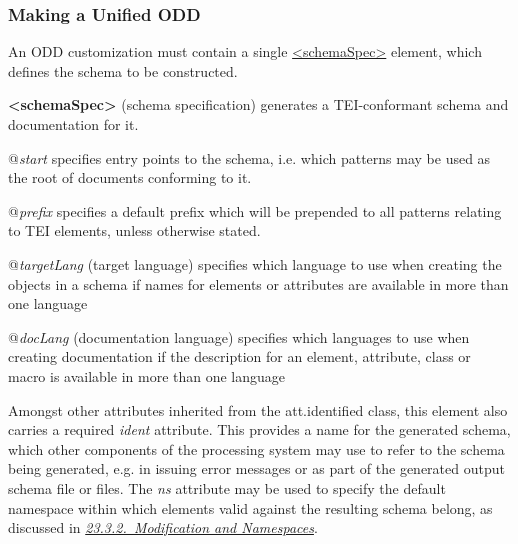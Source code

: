 \subsubsection[{Making a Unified ODD}]{Making a Unified ODD}\label{IM-unified}\par
An ODD customization must contain a single \hyperref[TEI.schemaSpec]{<schemaSpec>} element, which defines the schema to be constructed. 
\begin{sansreflist}
  
\item [\textbf{<schemaSpec>}] (schema specification) generates a TEI-conformant schema and documentation for it.\hfil\\[-10pt]\begin{sansreflist}
    \item[@{\itshape start}]
  specifies entry points to the schema, i.e. which patterns may be used as the root of documents conforming to it.
    \item[@{\itshape prefix}]
  specifies a default prefix which will be prepended to all patterns relating to TEI elements, unless otherwise stated.
    \item[@{\itshape targetLang}]
  (target language) specifies which language to use when creating the objects in a schema if names for elements or attributes are available in more than one language
    \item[@{\itshape docLang}]
  (documentation language) specifies which languages to use when creating documentation if the description for an element, attribute, class or macro is available in more than one language
\end{sansreflist}  
\end{sansreflist}
 Amongst other attributes inherited from the \textsf{att.identified} class, this element also carries a required {\itshape ident} attribute. This provides a name for the generated schema, which other components of the processing system may use to refer to the schema being generated, e.g. in issuing error messages or as part of the generated output schema file or files. The {\itshape ns} attribute may be used to specify the default namespace within which elements valid against the resulting schema belong, as discussed in \textit{\hyperref[MDNS]{23.3.2.\ Modification and Namespaces}}.\par
